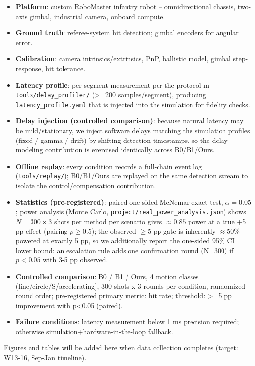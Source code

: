 \documentclass[journal]{IEEEtran}
\begin{document}
\begin{itemize}
\item \textbf{Platform}: custom RoboMaster infantry robot -- omnidirectional chassis, two-axis gimbal, industrial camera, onboard compute.
\item \textbf{Ground truth}: referee-system hit detection; gimbal encoders for angular error.
\item \textbf{Calibration}: camera intrinsics/extrinsics, PnP, ballistic model, gimbal step-response, hit tolerance.
\item \textbf{Latency profile}: per-segment measurement per the protocol in \texttt{tools/delay\_profiler/} (>=200 samples/segment), producing \texttt{latency\_profile.yaml} that is injected into the simulation for fidelity checks.
\item \textbf{Delay injection (controlled comparison)}: because natural latency may be mild/stationary, we inject software delays matching the simulation profiles (fixed / gamma / drift) by shifting detection timestamps, so the delay-modeling contribution is exercised identically across B0/B1/Ours.
\item \textbf{Offline replay}: every condition records a full-chain event log (\texttt{tools/replay/}); B0/B1/Ours are replayed on the same detection stream to isolate the control/compensation contribution.
\item \textbf{Statistics (pre-registered)}: paired one-sided McNemar exact test, $\alpha=0.05$; power analysis (Monte Carlo, \texttt{project/real\_power\_analysis.json}) shows $N=300\times3$ shots per method per scenario gives $\approx0.85$ power at a true +5 pp effect (pairing $\rho\ge0.5$); the observed $\ge5$ pp gate is inherently $\approx50\%$ powered at exactly 5 pp, so we additionally report the one-sided 95\% CI lower bound; an escalation rule adds one confirmation round (N=300) if $p<0.05$ with 3-5 pp observed.
\item \textbf{Controlled comparison}: B0 / B1 / Ours, 4 motion classes (line/circle/S/accelerating), 300 shots x 3 rounds per condition, randomized round order; pre-registered primary metric: hit rate; threshold: >=5 pp improvement with p<0.05 (paired).
\item \textbf{Failure conditions}: latency measurement below 1 ms precision required; otherwise simulation+hardware-in-the-loop fallback.
\end{itemize}

Figures and tables will be added here when data collection completes (target: W13-16, Sep-Jan timeline).
\end{document}
